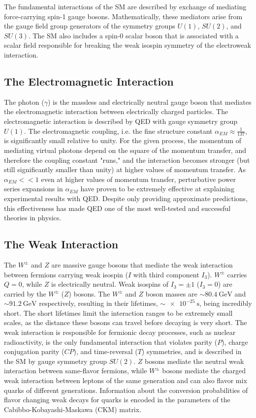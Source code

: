 The fundamental interactions of the SM are described by exchange of mediating force-carrying spin-1 gauge bosons.
Mathematically, these mediators arise from the gauge field group generators of the symmetry groups $U(1)$, $SU(2)$, and $SU(3)$.
The SM also includes a spin-0 scalar boson that is associated with a scalar field responsible for breaking the weak isospin symmetry of the electroweak interaction.

\subsection{The Electromagnetic Interaction}
The photon ($\gamma$) is the massless and electrically neutral gauge boson that mediates the electromagnetic interaction between electrically charged particles.
The electromagnetic interaction is described by QED with gauge symmetry group $U(1)$.
The electromagnetic coupling, i.e. the fine structure constant $\alpha_{EM} \approx \frac{1}{137}$, is significantly small relative to unity.
For the given process, the momentum of mediating virtual photons depend on the square of the momentum transfer, and therefore the coupling constant "runs," and the interaction becomes stronger (but still significantly smaller than unity) at higher values of momentum transfer.
As $\alpha_{EM} << 1$ even at higher values of momentum transfer, perturbative power series expansions in $\alpha_{EM}$ have proven to be extremely effective at explaining experimental results with QED.
Despite only providing approximate predictions, this effectiveness has made QED one of the most well-tested and successful theories in physics.

\subsection{The Weak Interaction}
The $W^\pm$ and $Z$ are massive gauge bosons that mediate the weak interaction between fermions carrying weak isospin ($I$ with third component $I_3$).
$W^\pm$ carries $Q = 0$, while $Z$ is electrically neutral.
Weak isospins of $I_3 = \pm 1$ ($I_3 = 0$) are carried by the $W^\pm$ ($Z$) bosons.
The $W^\pm$ and $Z$ boson masses are $\sim \SI{80.4}{\GeV}$ and $\sim \SI{91.2}{\GeV}$ respectively, resulting in their lifetimes, $\sim \SI{e-25}{\s}$, being incredibly short.
The short lifetimes limit the interaction ranges to be extremely small scales, as the distance these bosons can travel before decaying is very short.
The weak interaction is responsible for fermionic decay processes, such as nuclear radioactivity, is the only fundamental interaction that violates parity ($P$), charge conjugation parity ($CP$), and time-reversal ($T$) symmetries, and is described in the SM by gauge symmetry group $SU(2)$.
$Z$ bosons mediate the neutral weak interaction between same-flavor fermions, while $W^\pm$ bosons mediate the charged weak interaction between leptons of the same generation and can also flavor mix quarks of different generations.
Information about the conversion probabilities of flavor changing weak decays for quarks is encoded in the parameters of the Cabibbo-Kobayashi-Maskawa (CKM) matrix.

